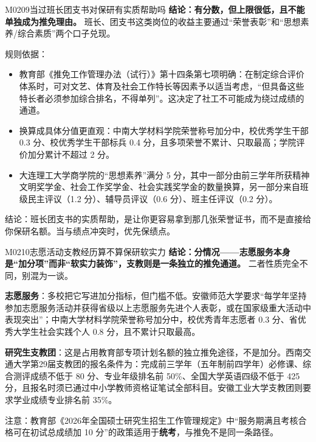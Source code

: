 \begin{qa}{M0209}{当过班长团支书对保研有实质帮助吗}
\textbf{结论：有分数，但上限很低，且不能单独成为推免理由。} 班长、团支书这类岗位的收益主要通过“荣誉表彰”和“思想素养/综合素质”两个口子兑现。

规则依据：
\begin{itemize}
  \item 教育部《推免工作管理办法（试行）》第十四条第七项明确：在制定综合评价体系时，可对文艺、体育及社会工作特长等因素予以适当考虑，“但具备这些特长者必须参加综合排名，不得单列”。这决定了社工不可能成为绕过成绩的通道。
  \item 换算成具体分值更直观：中南大学材料学院荣誉称号加分中，校优秀学生干部 0.3 分、校优秀学生干部标兵 0.4 分，且多项荣誉不累计、只取最高；学院评价加分累计不超过 2 分。
  \item 大连理工大学商学院的“思想素养”满分 5 分，其中一部分由前三学年所获精神文明奖学金、社会工作奖学金、社会实践奖学金的数量换算，另一部分来自班级民主评议（1.2 分）、辅导员评议（0.6 分）、班主任评议（0.2 分）。
\end{itemize}

结论：班长团支书的实质帮助，是让你更容易拿到那几张荣誉证书，而不是直接给你保研名额。当与绩点冲突时，优先保绩点。
\end{qa}

\begin{qa}{M0210}{志愿活动支教经历算不算保研软实力}
\textbf{结论：分情况——志愿服务本身是“加分项”而非“软实力装饰”，支教则是一条独立的推免通道。} 二者性质完全不同，别混为一谈。

\textbf{志愿服务}：多校把它写进加分指标，但门槛不低。安徽师范大学要求“每学年坚持参加志愿服务活动并获得省级以上志愿服务先进个人表彰，或在国家级重大活动中表现突出”；中南大学材料学院荣誉称号加分中，校优秀青年志愿者 0.3 分、省优秀大学生社会实践个人 0.8 分，且不累计只取最高。

\textbf{研究生支教团}：这是占用教育部专项计划名额的独立推免途径，不是加分。西南交通大学第29届支教团的报名条件为：完成前三学年（五年制前四学年）必修课、综合测评成绩不低于 80 分、专业年级排名前 50\%、全国大学英语四级不低于 425 分，且报名时须已通过中小学教师资格证笔试全部科目。安徽工业大学支教团则要求学业成绩专业排名前 35\%。

注意：教育部《2026年全国硕士研究生招生工作管理规定》中“服务期满且考核合格可在初试总成绩加 10 分”的政策适用于\textbf{统考}，与推免不是同一条路径。
\end{qa}

